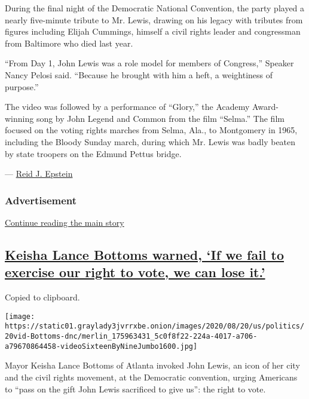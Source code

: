 During the final night of the Democratic National Convention, the party
played a nearly five-minute tribute to Mr. Lewis, drawing on his legacy
with tributes from figures including Elijah Cummings, himself a civil
rights leader and congressman from Baltimore who died last year.

``From Day 1, John Lewis was a role model for members of Congress,''
Speaker Nancy Pelosi said. ``Because he brought with him a heft, a
weightiness of purpose.''

The video was followed by a performance of ``Glory,'' the Academy
Award-winning song by John Legend and Common from the film ``Selma.''
The film focused on the voting rights marches from Selma, Ala., to
Montgomery in 1965, including the Bloody Sunday march, during which Mr.
Lewis was badly beaten by state troopers on the Edmund Pettus bridge.

--- \href{https://www.nytimes3xbfgragh.onion/by/reid-j-epstein}{Reid J.
Epstein}

\hypertarget{advertisement-5}{%
\subsubsection{Advertisement}\label{advertisement-5}}

\protect\hyperlink{after-dfp-ad-mid6}{Continue reading the main story}

\hypertarget{keisha-lance-bottoms-warned-if-we-fail-to-exercise-our-right-to-vote-we-can-lose-it}{%
\subsection{\texorpdfstring{\protect\hyperlink{keisha-lance-bottoms-warned-if-we-fail-to-exercise-our-right-to-vote-we-can-lose-it}{Keisha
Lance Bottoms warned, `If we fail to exercise our right to vote, we can
lose
it.'}}{Keisha Lance Bottoms warned, `If we fail to exercise our right to vote, we can lose it.'}}\label{keisha-lance-bottoms-warned-if-we-fail-to-exercise-our-right-to-vote-we-can-lose-it}}

Copied to clipboard.

\texttt{[image: https://static01.graylady3jvrrxbe.onion/images/2020/08/20/us/politics/20vid-Bottoms-dnc/merlin\_175963431\_5c0f8f22-224a-4017-a706-a79670864458-videoSixteenByNineJumbo1600.jpg]}

Mayor Keisha Lance Bottoms of Atlanta invoked John Lewis, an icon of her
city and the civil rights movement, at the Democratic convention, urging
Americans to ``pass on the gift John Lewis sacrificed to give us'': the
right to vote.

